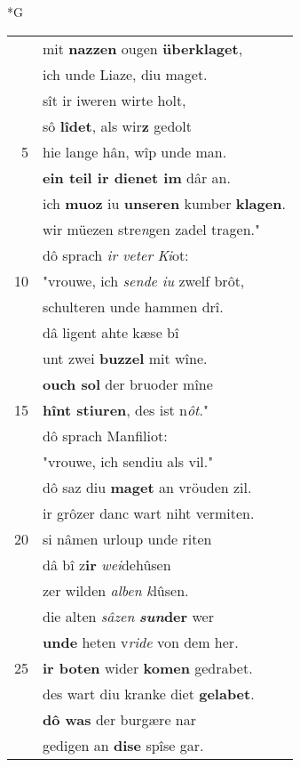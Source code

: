 \documentclass[8pt,a4paper,notitlepage]{article}
\begin{document}
\begin{table}[ht]
\begin{minipage}[t]{0.5\linewidth}
\small
\begin{center}*G
\end{center}
\begin{tabular}{rl}
 & mit \textbf{nazzen} ougen \textbf{überklaget},\\ 
 & ich unde Liaze, diu maget.\\ 
 & sît ir iweren wirte holt,\\ 
 & sô \textbf{lîdet}, als wir\textbf{z} gedolt\\ 
5 & hie lange hân, wîp unde man.\\ 
 & \textbf{ein teil ir dienet im} dâr an.\\ 
 & ich \textbf{muoz} iu \textbf{unseren} kumber \textbf{klagen}.\\ 
 & wir müezen stre\textit{n}gen zadel tragen."\\ 
 & dô sprach \textit{ir veter} \textit{Ki}ot:\\ 
10 & "vrouwe, ich \textit{sende iu} zwelf brôt,\\ 
 & schulteren unde hammen drî.\\ 
 & dâ ligent ahte kæse bî\\ 
 & unt zwei \textbf{buzzel} mit wîne.\\ 
 & \textbf{ouch sol} der bruoder mîne\\ 
15 & \textbf{hînt stiuren}, des ist n\textit{ôt}."\\ 
 & dô sprach Manfiliot:\\ 
 & "vrouwe, ich sendiu als vil."\\ 
 & dô saz diu \textbf{maget} an vröuden zil.\\ 
 & ir grôzer danc wart niht vermiten.\\ 
20 & si nâmen urloup unde riten\\ 
 & dâ bî z\textbf{ir} \textit{wei}dehûsen\\ 
 & zer wilden \textit{alben} \textit{k}lûsen.\\ 
 & die alten \textit{sâzen} \textbf{\textit{sun}der} wer\\ 
 & \textbf{unde} heten v\textit{ride} von dem her.\\ 
25 & \textbf{ir boten} wider \textbf{komen} gedrabet.\\ 
 & des wart diu kranke diet \textbf{gelabet}.\\ 
 & \textbf{dô was} der burgære nar\\ 
 & gedigen an \textbf{dise} spîse gar.\\ 

\end{tabular}
\end{minipage}
\end{table}
\end{document}
